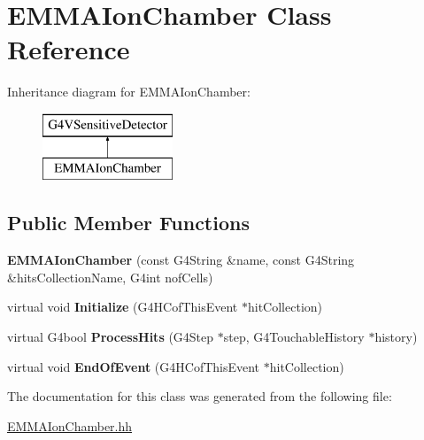 \hypertarget{classEMMAIonChamber}{\section{E\-M\-M\-A\-Ion\-Chamber Class Reference}
\label{classEMMAIonChamber}
}
Inheritance diagram for E\-M\-M\-A\-Ion\-Chamber\-:\begin{figure}[H]
\begin{center}
\leavevmode
\includegraphics[height=2.000000cm]{classEMMAIonChamber}
\end{center}
\end{figure}
\subsection*{Public Member Functions}
\begin{DoxyCompactItemize}
\item 
\hypertarget{classEMMAIonChamber_a8972e800fbf5dce95809f5b876149af8}{{\bfseries E\-M\-M\-A\-Ion\-Chamber} (const G4\-String \&name, const G4\-String \&hits\-Collection\-Name, G4int nof\-Cells)}\label{classEMMAIonChamber_a8972e800fbf5dce95809f5b876149af8}

\item 
\hypertarget{classEMMAIonChamber_a3d9455e5e2cbb09b58ae88d1cd57a200}{virtual void {\bfseries Initialize} (G4\-H\-Cof\-This\-Event $\ast$hit\-Collection)}\label{classEMMAIonChamber_a3d9455e5e2cbb09b58ae88d1cd57a200}

\item 
\hypertarget{classEMMAIonChamber_ab0d46e67d9421ac3a165c1e697f8c564}{virtual G4bool {\bfseries Process\-Hits} (G4\-Step $\ast$step, G4\-Touchable\-History $\ast$history)}\label{classEMMAIonChamber_ab0d46e67d9421ac3a165c1e697f8c564}

\item 
\hypertarget{classEMMAIonChamber_a0342f4d809c2c309534fd6b6ce985687}{virtual void {\bfseries End\-Of\-Event} (G4\-H\-Cof\-This\-Event $\ast$hit\-Collection)}\label{classEMMAIonChamber_a0342f4d809c2c309534fd6b6ce985687}

\end{DoxyCompactItemize}


The documentation for this class was generated from the following file\-:\begin{DoxyCompactItemize}
\item 
\hyperlink{EMMAIonChamber_8hh}{E\-M\-M\-A\-Ion\-Chamber.\-hh}\end{DoxyCompactItemize}
